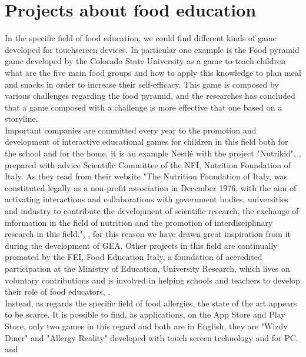 \section{Projects about food education}
In the specific field of food education, we could find different kinds of game developed for touchscreen devices. In particular one example is the Food pyramid game developed by the Colorado State University \cite{Serrano} as a game to teach children what are the five main food groups and how to apply this knowledge to plan meal and snacks in order to increase their self-efficacy. This game is composed by various challenges regarding the food pyramid, and the researches has concluded that a game composed with a challenge is more effective that one based on a storyline.\\
Important companies are committed every year to the promotion and development of interactive educational games for children in this field both for the school and for the home, it is an example Nestl\'e with the project "Nutrikid", \cite{Nutrikid}, prepared with advice Scientific Committee of the NFI, Nutrition Foundation of Italy. As they read from their website "The Nutrition Foundation of Italy, was constituted legally as a non-profit association in December 1976, with the aim of activating interactions and collaborations with government bodies, universities and industry to contribute the development of scientific research, the exchange of information in the field of nutrition and the promotion of interdisciplinary research in this field.", \cite{NFI}, for this reason we have drawn great inspiration from it during the development of GEA. Other projects in this field are continually promoted by the FEI, Food Education Italy, a foundation of accredited participation at the Ministry of Education, University Research, which lives on voluntary contributions and is involved in helping schools and teachers to develop their role of food educators, \cite{FEI}.\\
Instead, as regards the specific field of food allergies, the state of the art appears to be scarce. It is possible to find, as applications, on the App Store and Play Store, only two games in this regard and both are in English, they are "Wizdy Diner" and "Allergy Reality" developed with touch screen technology and for PC. \cite{Wizdy} and \cite{Allergy}
